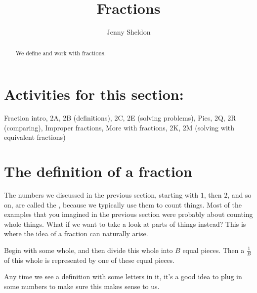 \documentclass{ximera}
\title{Fractions}
\author{Jenny Sheldon}
\begin{document}
\begin{abstract}
We define and work with fractions.
\end{abstract}
\maketitle

\section{Activities for this section:} Fraction intro, 2A, 2B (definitions), 2C, 2E (solving problems), Pies, 2Q, 2R (comparing), Improper fractions, More with fractions, 2K, 2M (solving with equivalent fractions)

\section{The definition of a fraction}

The numbers we discussed in the previous section, starting with $1$, then $2$, and so on, are called the , because we typically use them to count things. Most of the examples that you imagined in the previous section were probably about counting whole things. What if we want to take a look at parts of things instead? This is where the idea of a fraction can naturally arise. 

\begin{definition}
Begin with some whole, and then divide this whole into $B$ equal pieces. Then a  $\frac{1}{B}$ of this whole is represented by one of these equal pieces.
\end{definition}
Any time we see a definition with some letters in it, it's a good idea to plug in some numbers to make sure this makes sense to us.
\end{document}

